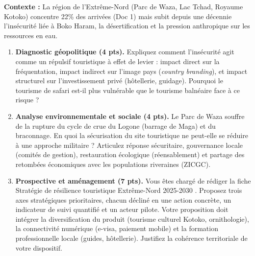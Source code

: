 \documentclass[11pt]{article}
\begin{document}
\begin{exercice}
\textbf{Contexte :} La région de l'Extrême-Nord (Parc de Waza, Lac Tchad, Royaume Kotoko) concentre 22\% des arrivées (Doc 1) mais subit depuis une décennie l'insécurité liée à Boko Haram, la désertification et la pression anthropique sur les ressources en eau.

\begin{enumerate}
    \item \textbf{Diagnostic géopolitique (4 pts).} Expliquez comment l'insécurité agit comme un \og répulsif touristique \fg à effet de levier : impact direct sur la fréquentation, impact indirect sur l'image pays (\textit{country branding}), et impact structurel sur l'investissement privé (hôtellerie, guidage). Pourquoi le tourisme de safari est-il plus vulnérable que le tourisme balnéaire face à ce risque ?
    \item \textbf{Analyse environnementale et sociale (4 pts).} Le Parc de Waza souffre de la rupture du cycle de crue du Logone (barrage de Maga) et du braconnage. En quoi la \og sécurisation \fg du site touristique ne peut-elle se réduire à une approche militaire ? Articulez réponse sécuritaire, gouvernance locale (comités de gestion), restauration écologique (réensablement) et partage des retombées économiques avec les populations riveraines (ZICGC).
    \item \textbf{Prospective et aménagement (7 pts).} Vous êtes chargé de rédiger la fiche \og Stratégie de résilience touristique Extrême-Nord 2025-2030 \fg. Proposez trois axes stratégiques prioritaires, chacun décliné en une action concrète, un indicateur de suivi quantifié et un acteur pilote. Votre proposition doit intégrer la diversification du produit (tourisme culturel Kotoko, ornithologie), la connectivité numérique (e-visa, paiement mobile) et la formation professionnelle locale (guides, hôtellerie). Justifiez la cohérence territoriale de votre dispositif.
\end{enumerate}
\end{exercice}
\end{document}
